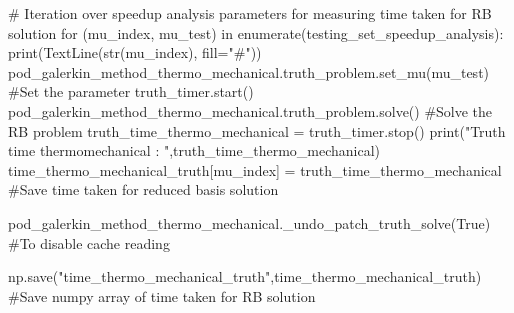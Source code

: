 \begin{python}
# Iteration over speedup analysis parameters for measuring time taken for RB solution
for (mu_index, mu_test) in enumerate(testing_set_speedup_analysis):
	print(TextLine(str(mu_index), fill="#"))
	pod_galerkin_method_thermo_mechanical.truth_problem.set_mu(mu_test) #Set the parameter
	truth_timer.start()
	pod_galerkin_method_thermo_mechanical.truth_problem.solve() #Solve the RB problem
	truth_time_thermo_mechanical = truth_timer.stop()
	print("Truth time thermomechanical : ",truth_time_thermo_mechanical)
	time_thermo_mechanical_truth[mu_index] = truth_time_thermo_mechanical #Save time taken for reduced basis solution

pod_galerkin_method_thermo_mechanical._undo_patch_truth_solve(True) #To disable cache reading

np.save("time_thermo_mechanical_truth",time_thermo_mechanical_truth) #Save numpy array of time taken for RB solution
\end{python}

